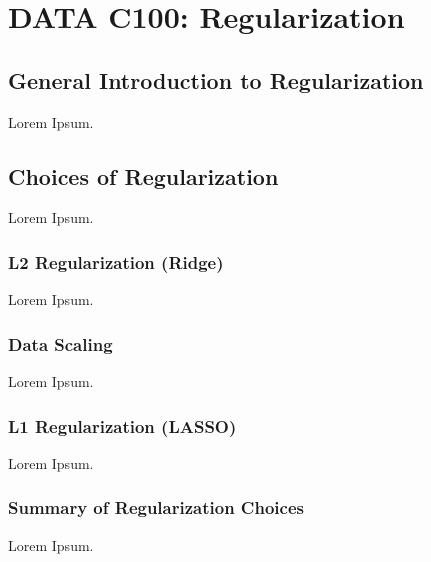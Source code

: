 \chapter{DATA C100: Regularization}

\section{General Introduction to Regularization}
Lorem Ipsum.

\section{Choices of Regularization}
Lorem Ipsum.

\subsection{L2 Regularization (Ridge)}
Lorem Ipsum.

\subsection{Data Scaling}
Lorem Ipsum.

\subsection{L1 Regularization (LASSO)}
Lorem Ipsum.

\subsection{Summary of Regularization Choices}
Lorem Ipsum.
